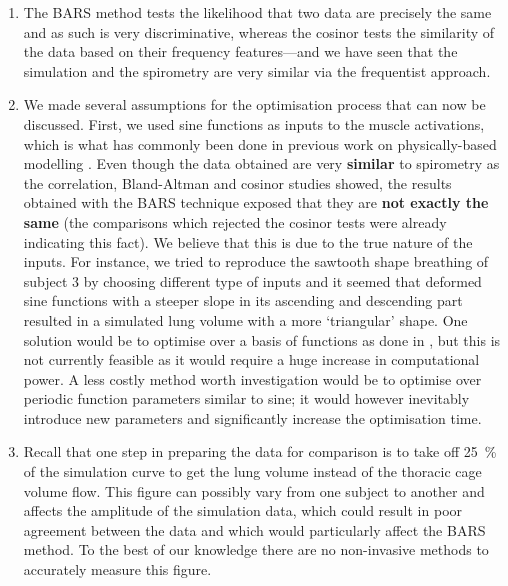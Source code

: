 \begin{enumerate}
	\item The BARS method tests the likelihood that two data are precisely the same and as such is very discriminative, whereas the cosinor tests the similarity of the data based on their frequency features---and we have seen that the simulation and the spirometry are very similar via the frequentist approach.  

	\item We made several assumptions for the optimisation process that can now be discussed. First, we used sine functions as inputs to the muscle activations, which is what has commonly been done in previous work on physically-based modelling \cite{zordan2004breathe, lee2009comprehensive, veltkamp2009physiological}. Even though the data obtained are very \textbf{similar} to spirometry as the correlation, Bland-Altman and cosinor studies showed, the results obtained with the BARS technique exposed that they are \textbf{not exactly the same} (the comparisons which rejected the cosinor tests were already indicating this fact). We believe that this is due to the true nature of the inputs. For instance, we tried to reproduce the sawtooth shape breathing of subject 3 by choosing different type of inputs and it seemed that deformed sine functions with a steeper slope in its ascending and descending part resulted in a simulated lung volume with a more `triangular' shape. One solution would be to optimise over a basis of functions as done in \cite{tu1994artificial}, but this is not currently feasible as it would require a huge increase in computational power. A less costly method worth investigation would be to optimise over periodic function parameters similar to sine; it would however inevitably introduce new parameters and significantly increase the optimisation time.
	
	\item Recall that one step in preparing the data for comparison is to take off 25~\% of the simulation curve to get the lung volume instead of the thoracic cage volume flow. This figure can possibly vary from one subject to another and affects the amplitude of the simulation data, which could result in poor agreement between the data and which would particularly affect the BARS method. To the best of our knowledge there are no non-invasive methods to accurately measure this figure.
\end{enumerate}

